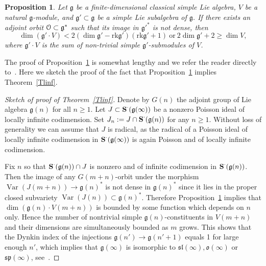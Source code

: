 \documentclass{emsprocart}
\newtheorem{proposition}[theorem]{Proposition}
\begin{document}
\begin{proposition}\label{P321} Let $\mathfrak g$ be a finite-dimensional classical simple Lie algebra, $V$ be a natural $\mathfrak g$-module, and $\mathfrak g'\subset\mathfrak g$ be a simple Lie subalgebra of $\mathfrak g$. If there exists an adjoint orbit $\EuScript O\subset \mathfrak g^*$ such that its image in $\mathfrak g'^*$ is not dense, then
$$\dim (\mathfrak g'\cdot V)<2(\dim\mathfrak g'-\mathrm{rk}\mathfrak g') (\mathrm{rk}\mathfrak g'+1)~\mathrm{or}~2\dim\mathfrak g'+2\ge\dim V,$$
where $\mathfrak g'\cdot V$ is the sum of non-trivial simple $\mathfrak g'$-submodules of $V$.
\end{proposition}
The proof of Proposition~\ref{P321} is somewhat lengthy and we refer the reader directly to~\cite{PP1}.  Here we sketch the proof of the fact that Proposition~\ref{P321} implies Theorem~\ref{Tlinf}.
\begin{proof}[Sketch of proof of Theorem~\ref{Tlinf}] Denote by $G(n)$ the adjoint group of Lie algebra $\mathfrak g(n)$ for all $n\ge 1$. Let $J\subset\operatorname{\bf S}^\cdot(\mathfrak g(\infty))$ be a nonzero Poisson ideal of locally infinite codimension. Set $J_n:=J\cap\operatorname{\bf S}^\cdot(\mathfrak g(n))$ for any $n\ge1$.  Without loss of generality we can assume that $J$ is radical, as the radical of a Poisson ideal of locally infinite codimension in $\operatorname{\bf S}^\cdot(\mathfrak g(\infty))$ is again Poisson and of locally infinite codimension.

Fix $n$ so that $\operatorname{\bf S}^\cdot(\mathfrak g(n))\cap J$ is nonzero and of infinite codimension in $\operatorname{\bf S}^\cdot(\mathfrak g(n))$. Then the image of any $G(m+n)$-orbit under the morphism $\operatorname{Var}(J(m+n))\to \mathfrak g(n)^*$ is not dense in $\mathfrak g(n)^*$ since it lies in the proper closed subvariety $\operatorname{Var}(J(n))\subset\mathfrak g(n)^*$. Therefore Proposition~\ref{P321} implies that $\dim (\mathfrak g(n)\cdot V(m+n))$ is bounded by some function which depends on $n$ only. Hence the number of nontrivial simple $\mathfrak g(n)$-constituents in $V(m+n)$ and their dimensions are simultaneously bounded as $m$ grows.
This shows that the Dynkin index of the injections $\mathfrak g(n')\to\mathfrak g(n'+1)$ equals 1 for large enough $n'$, which implies that $\mathfrak g(\infty) $ is isomorphic to $\mathfrak{sl}(\infty), \mathfrak o(\infty)$ or $\mathfrak{sp}(\infty)$, see~\cite[proof of Theorem 3.1]{PP1}.
\end{proof}
\end{document}
